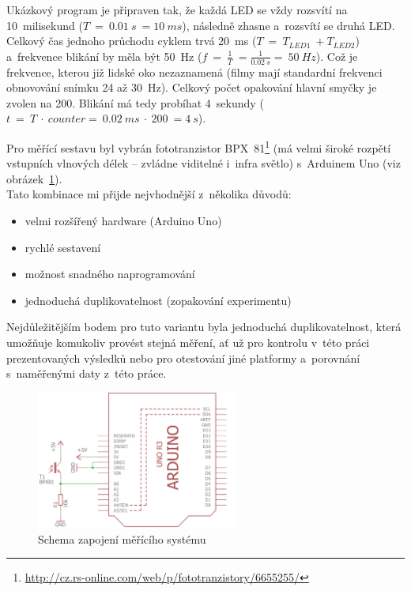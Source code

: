 Ukázkový program je připraven tak, že každá LED se vždy rozsvítí na 10~milisekund ($T~=~0.01~s~= 10~ms$), následně zhasne a~rozsvítí se druhá LED.  
Celkový čas jednoho průchodu cyklem trvá 20~ms ($T~=~T_{LED1}~+ T_{LED2}$) a~frekvence blikání by měla být 50~Hz ($f~=~\frac{1}{T}~= \frac{1}{0.02~s} =~50~Hz$). 
Což je frekvence, kterou již lidské oko nezaznamená (filmy mají standardní frekvenci obnovování snímku 24 až 30~Hz). %
Celkový počet opakování hlavní smyčky je zvolen na 200. 
Blikání má tedy probíhat 4~sekundy ($t~=~T~\cdot~counter =~0.02~ms~\cdot~200~= 4~s$).

Pro měřící sestavu byl vybrán fototranzistor BPX~81\footnote{\url{http://cz.rs-online.com/web/p/fototranzistory/6655255/}} (má velmi široké rozpětí vstupních vlnových délek -- zvládne viditelné i~infra světlo) s~Arduinem Uno (viz obrázek~\ref{fig:arduino-measuring-system}). \\

Tato kombinace mi přijde nejvhodnější z~několika důvodů: 

\begin{itemize}
	\item velmi rozšířený hardware (Arduino Uno)
	\item rychlé sestavení
	\item možnost snadného naprogramování
	\item jednoduchá duplikovatelnost (zopakování experimentu)
\end{itemize}  

Nejdůležitějším bodem pro tuto variantu byla jednoduchá duplikovatelnost, která umožňuje komukoliv provést stejná měření, ať už pro kontrolu v~této práci prezentovaných výsledků nebo pro otestování jiné platformy a~porovnání s~naměřenými daty z~této práce.

\begin{figure}[h]
	\centering
	\includegraphics[width=250px]{images/measuring-arduino-system_schema.png}	
	\caption[Schema zapojení měřícího systému]{Schema zapojení měřícího systému}
	\label{fig:arduino-measuring-system}
\end{figure}

